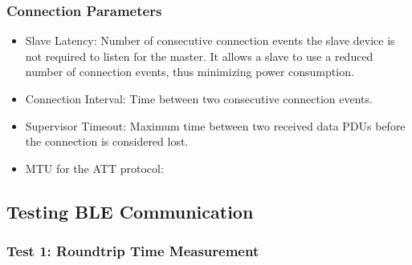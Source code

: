 \subsubsection{Connection Parameters}

\begin{itemize}
    \item Slave Latency: Number of consecutive connection events the slave device is not required to listen for the master. It allows a slave to use a reduced number of connection events, thus minimizing power consumption.
    \item Connection Interval: Time between two consecutive connection events.
    \item Supervisor Timeout: Maximum time between two received data \acs{PDU}s before the connection is considered lost.
    \item \acf{MTU} for the \acs{ATT} protocol: 
\end{itemize}


\subsection{Testing \acs{BLE} Communication} 

\subsubsection{Test 1: Roundtrip Time Measurement}


